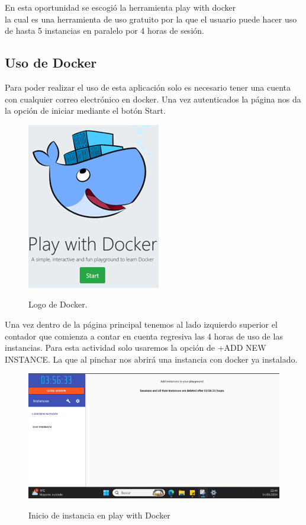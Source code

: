 \documentclass[stu, 11pt, letterpaper, donotrepeattitle, floatsintext, natbib]{apa7}
\begin{document}
En esta oportunidad se escogió la herramienta play with docker \noindent{}\\ la cual es una herramienta de uso gratuito por la que el usuario puede hacer uso de hasta 5 instancias en paralelo por 4 horas de sesión.

\subsection{Uso de Docker} 

Para poder realizar el uso de esta aplicación solo es necesario tener una cuenta con cualquier correo electrónico en docker. Una vez autenticados la página nos da la opción de iniciar mediante el botón Start.

\begin{figure}[H]
    \centering
    \caption{Logo de Docker.}
    \includegraphics[width=0.3\linewidth]{docker1.png} %
    \label{fig:OverallEffect}
\end{figure}

Una vez dentro de la página principal tenemos al lado izquierdo superior el contador que comienza a contar en cuenta regresiva las 4 horas de uso de las instancias. Para esta actividad solo usaremos la opción de +ADD NEW INSTANCE. La que al pinchar nos abrirá una instancia con docker ya instalado. 

\begin{figure}[H]
    \centering
    \caption{Inicio de instancia en play with Docker}
    \includegraphics[width=0.75\linewidth]{docker2.png} %
    \label{fig:OverallEffect}
\end{figure}
\end{document}
